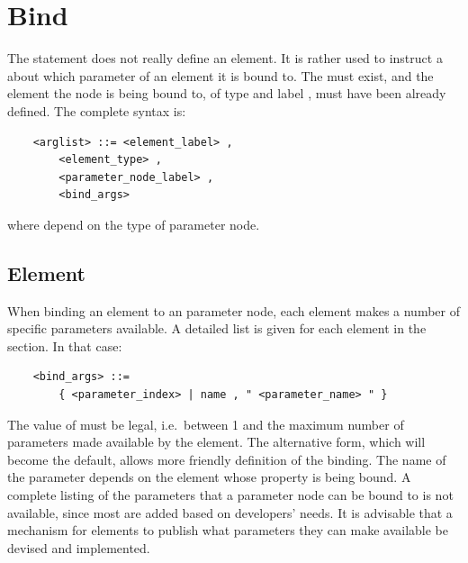 


\section{Bind}\label{sec:EL:BIND}
The statement  does not really define an element.
It is rather used to instruct a
about which parameter of an element it is bound to.
The  must exist, and the element the node 
is being bound to, of type  and label ,
must have been already defined.
The complete syntax is:
\begin{verbatim}
    <arglist> ::= <element_label> , 
        <element_type> ,
        <parameter_node_label> , 
        <bind_args>
\end{verbatim}
where  depend on the type of parameter node.

\subsection{Element}
When binding an element to an 
 parameter node,
each element makes a number of specific parameters available.
A detailed list is given for each element in the 
section.
In that case:
\begin{verbatim}
    <bind_args> ::=
        { <parameter_index> | name , " <parameter_name> " }
\end{verbatim}
The value of  must be legal, i.e.\ between 1 and the
maximum number of parameters made available by the element.
The alternative form, which will become the default, allows more
friendly definition of the binding.
The name of the parameter depends on the element whose property
is being bound.
A complete listing of the parameters that a parameter node 
can be bound to is not available, since most are added based
on developers' needs.
It is advisable that a mechanism for elements to publish 
what parameters they can make available be devised and implemented.

